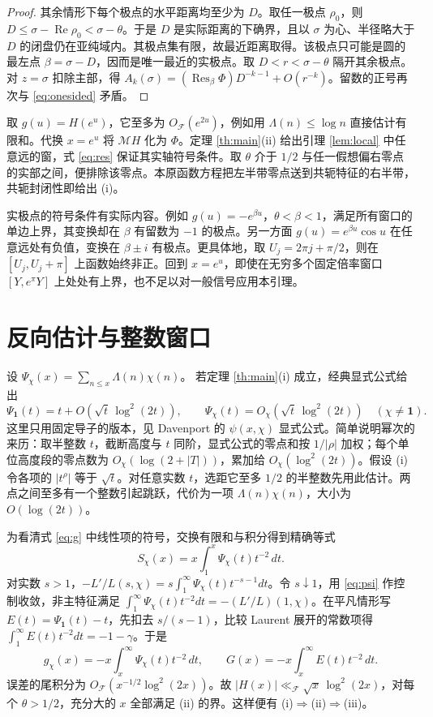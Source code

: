 \documentclass[UTF8,fontset=none,a4paper,11pt]{ctexart}
\theoremstyle{definition}
\newcommand{\re}{\operatorname{Re}}\newcommand{\e}{\varepsilon}
\newcommand{\F}{\mathcal F}\newcommand{\Res}{\operatorname{Res}}
\begin{document}
\begin{proof}
其余情形下每个极点的水平距离均至少为 $D$。取任一极点 $\rho_0$，则 $D\le\sigma-\re\rho_0<\sigma-\theta$。于是 $D$ 是实际距离的下确界，且以 $\sigma$ 为心、半径略大于 $D$ 的闭盘仍在亚纯域内。其极点集有限，故最近距离取得。该极点只可能是圆的最左点 $\beta=\sigma-D$，因而是唯一最近的实极点。取 $D<r<\sigma-\theta$ 隔开其余极点。对 $z=\sigma$ 扣除主部，得 $A_k(\sigma)=(\Res_\beta\Phi)D^{-k-1}+O(r^{-k})$。留数的正号再次与 \eqref{eq:onesided} 矛盾。
\end{proof}

取 $g(u)=H(e^u)$，它至多为 $O_\F(e^{2u})$，例如用 $\Lambda(n)\le\log n$ 直接估计有限和。代换 $x=e^u$ 将 $\mathcal M H$ 化为 $\Phi$。定理 \ref{th:main}(ii) 给出引理 \ref{lem:local} 中任意远的窗，式 \eqref{eq:res} 保证其实轴符号条件。取 $\theta$ 介于 $1/2$ 与任一假想偏右零点的实部之间，便排除该零点。本原函数方程把左半带零点送到共轭特征的右半带，共轭封闭性即给出 (i)。

实极点的符号条件有实际内容。例如 $g(u)=-e^{\beta u}$，$\theta<\beta<1$，满足所有窗口的单边上界，其变换却在 $\beta$ 有留数为 $-1$ 的极点。另一方面 $g(u)=e^{\beta u}\cos u$ 在任意远处有负值，变换在 $\beta\pm i$ 有极点。更具体地，取 $U_j=2\pi j+\pi/2$，则在 $[U_j,U_j+\pi]$ 上函数始终非正。回到 $x=e^u$，即使在无穷多个固定倍率窗口 $[Y,e^\pi Y]$ 上处处有上界，也不足以对一般信号应用本引理。

\section{反向估计与整数窗口}\label{sec:integer}
设 $\Psi_\chi(x)=\sum_{n\le x}\Lambda(n)\chi(n)$。
若定理 \ref{th:main}(i) 成立，经典显式公式给出
\begin{equation}
 \Psi_{\mathbf1}(t)=t+O(\sqrt t\,\log^2(2t)),\qquad
 \Psi_\chi(t)=O_\chi(\sqrt t\,\log^2(2t))\quad(\chi\ne\mathbf1).
 \label{eq:psi}
\end{equation}
这里只用固定导子的版本，见 Davenport \cite{dav} 的 $\psi(x,\chi)$ 显式公式。简单说明幂次的来历：取半整数 $t$，截断高度与 $t$ 同阶，显式公式的零点和按 $1/|\rho|$ 加权；每个单位高度段的零点数为 $O_\chi(\log(2+|T|))$，累加给 $O_\chi(\log^2(2t))$。假设 (i) 令各项的 $|t^\rho|$ 等于 $\sqrt t$。对任意实数 $t$，选距它至多 $1/2$ 的半整数先用此估计。两点之间至多有一个整数引起跳跃，代价为一项 $\Lambda(n)\chi(n)$，大小为 $O(\log(2t))$。

为看清式 \eqref{eq:g} 中线性项的符号，交换有限和与积分得到精确等式
\[
 S_\chi(x)=x\int_1^x\Psi_\chi(t)t^{-2}\,dt .
\]
对实数 $s>1$，$-L'/L(s,\chi)=s\int_1^\infty\Psi_\chi(t)t^{-s-1}dt$。令 $s\downarrow1$，用 \eqref{eq:psi} 作控制收敛，非主特征满足 $\int_1^\infty\Psi_\chi(t)t^{-2}dt=-(L'/L)(1,\chi)$。在平凡情形写 $E(t)=\Psi_{\mathbf1}(t)-t$，先扣去 $s/(s-1)$，比较 Laurent 展开的常数项得 $\int_1^\infty E(t)t^{-2}dt=-1-\gamma$。于是
\[
 g_\chi(x)=-x\int_x^\infty\Psi_\chi(t)t^{-2}\,dt,\qquad
 G(x)=-x\int_x^\infty E(t)t^{-2}\,dt .
\]
误差的尾积分为 $O_\F(x^{-1/2}\log^2(2x))$。故 $|H(x)|\ll_\F\sqrt x\,\log^2(2x)$，对每个 $\theta>1/2$，充分大的 $x$ 全部满足 (ii) 的界。这样便有 (i)$\Rightarrow$(ii)$\Rightarrow$(iii)。
\end{document}
